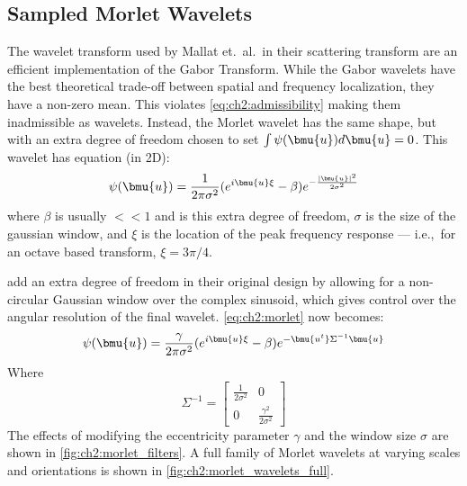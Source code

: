 \subsection{Sampled Morlet Wavelets}\label{sec:ch2:morlet_fourier}
  The wavelet transform used by Mallat et.\ al.\ in their scattering transform are an efficient
  implementation of the Gabor Transform.  While the Gabor wavelets have the best
  theoretical trade-off between spatial and frequency localization, they have a
  non-zero mean.  This violates \eqref{eq:ch2:admissibility} making them
  inadmissible as wavelets. Instead, the Morlet wavelet has the same shape, but
  with an extra degree of freedom chosen to set $\int \psi (\bmu{u}) d\bmu{u}
  =0$. This wavelet has equation (in 2D):
  \begin{equation}
    \psi(\bmu{u}) = \frac{1}{2\pi\sigma^2} {(e^{i\bmu{u}\xi} - \beta)}
                     e^{-\frac{|\bmu{u}|^2}{2\sigma^2}} 
    \label{eq:ch2:morlet}
  \end{equation}
  where $\beta$ is usually $<<1$ and is this extra degree of freedom, 
  $\sigma$ is the size of the gaussian window, and $\xi$ is the
  location of the peak frequency response --- i.e.,\ for an octave based
  transform, $\xi = 3\pi/4$.

  \citeauthor{bruna_invariant_2013} add an extra degree of freedom in their 
  original design \cite{bruna_invariant_2013} by allowing for a non-circular
  Gaussian window over the complex sinusoid, which gives control over the angular
  resolution of the final wavelet. \eqref{eq:ch2:morlet} now becomes:
  \begin{equation}
    \psi(\bmu{u}) = \frac{\gamma}{2\pi\sigma^2}{(e^{i\bmu{u}\xi} - \beta)}
                  e^{-\bmu{u^t}\Sigma^{-1}  \bmu{u}} 
    \label{eq:ch2:morlet_slant}
  \end{equation}
  Where
  $$\Sigma^{-1} = \left[ \begin{smallmatrix} 
      \frac{1}{2\sigma^2} & 0 \\ 
      0 & \frac{\gamma^2}{2\sigma^2} 
      \end{smallmatrix} \right] $$
  The effects of modifying the eccentricity parameter $\gamma$ and the window size
  $\sigma$ are shown in \autoref{fig:ch2:morlet_filters}. A full family of
  Morlet wavelets at varying scales and orientations is shown in 
  \autoref{fig:ch2:morlet_wavelets_full}.


